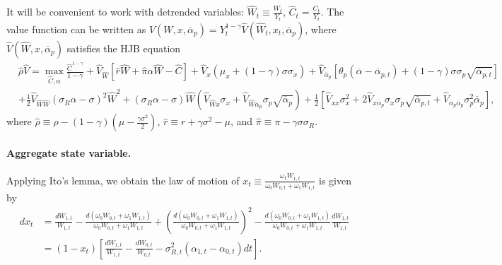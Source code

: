 It will be convenient to work with detrended variables: $\hat{W}_t \equiv \frac{W_t}{Y_t}$, $\hat{C}_t = \frac{C_t}{Y_t}$. The value function can be written as $V(W,x, \overline{\alpha}_p) = Y_t^{1-\gamma} \hat{V}(\hat{W}_t, x_t, \overline{\alpha}_p)$, where $\hat{V}(\hat{W},x, \overline{\alpha}_p)$ satisfies the HJB equation\small
\begin{align}
    &\hat{\rho} \hat{V} =  \max_{\hat{C},\alpha}\frac{\hat{C}^{1-\gamma}}{1-\gamma} + \hat{V}_{\hat{W}} \left[ \hat{r} \hat{W} + \hat{\pi}\alpha \hat{W} -\hat{C}  \right] + \hat{V}_x \left(\mu_x +(1-\gamma) \sigma \sigma_x \right)+ \hat{V}_{\overline{\alpha}_p} \left[\theta_p (\overline{\alpha}-\overline{\alpha}_{p,t})+(1-\gamma) \sigma \sigma_p \sqrt{\overline{\alpha}_{p,t}} \right] \nonumber\\
    &+ \frac{1}{2} \hat{V}_{\hat{W}\hat{W}} \left(\sigma_R \alpha-\sigma\right)^2 \hat{W}^2+(\sigma_R \alpha -\sigma) \hat{W} \left( \hat{V}_{\hat{W}x} \sigma_x  + \hat{V}_{\hat{W}\overline{\alpha}_p} \sigma_p \sqrt{\overline{\alpha}_p}\right)+ \frac{1}{2} \left[
        \hat{V}_{xx} \sigma_x^2 
    + 2 \hat{V}_{x \overline{\alpha}_p} \sigma_x \sigma_p \sqrt{\overline{\alpha}_{p,t}} 
    + \hat{V}_{\overline{\alpha}_p\overline{\alpha}_p} \sigma_p^2\overline{\alpha}_p\right],\nonumber
\end{align}
where $\hat{\rho} \equiv \rho - (1-\gamma) \left(\mu - \frac{\gamma \sigma^2}{2} \right)$, $\hat{r} \equiv r + \gamma \sigma^2 - \mu$, and $\hat{\pi} \equiv \pi - \gamma \sigma \sigma_R$.

\paragraph{Aggregate state variable.} Applying Ito's lemma, we obtain the law of motion of $x_t \equiv \frac{\omega_1 W_{1,t}}{\omega_0 W_{0,t} + \omega_1 W_{1,t}}$ is given by
\begin{align}
    d x_t &= \frac{d W_{1,t}}{W_{1,t}} - \frac{d \left(\omega_{0} W_{0,t} + \omega_{1} W_{1,t} \right)}{\omega_{0} W_{0,t} + \omega_{1} W_{1,t}} + \left( \frac{d \left(\omega_{0} W_{0,t} + \omega_{1} W_{1,t} \right)}{\omega_{0} W_{0,t} + \omega_{1} W_{1,t}} \right)^2 -  \frac{d \left(\omega_{0} W_{0,t} + \omega_{1} W_{1,t} \right)}{\omega_{0} W_{0,t} + \omega_{1} W_{1,t}} \frac{d W_{1,t}}{W_{1,t}}\\
    &= (1-x_t) \left[\frac{d W_{1,t}}{W_{1,t}}-\frac{d W_{0,t}}{W_{0,t}} - \sigma_{R,t}^2 (\alpha_{1,t} - \alpha_{0,t}) dt    \right].
\end{align}

